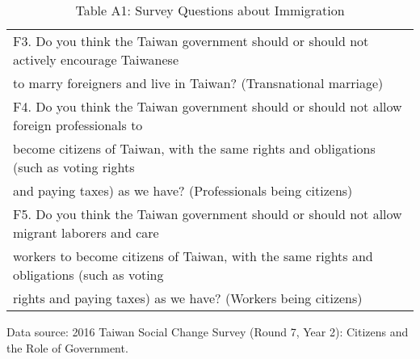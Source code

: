 \documentclass[12pt]{article}
\begin{document}
\begin{table}[ht!]
\begin{center}
  \begin{threeparttable}
\caption*{Table A1: Survey Questions about Immigration}
\begin{tabular}{l} 
\toprule
\midrule
F3. Do you think the Taiwan government should or should not actively encourage Taiwanese  \\
\qquad to marry foreigners and live in Taiwan? (Transnational marriage)   \\
F4. Do you think the Taiwan government should or should not allow foreign professionals to \\ 
\qquad become citizens of Taiwan, with the same rights and obligations (such as voting rights \\ 
\qquad and paying taxes) as we have? (Professionals being citizens)    \\
F5. Do you think the Taiwan government should or should not allow migrant laborers and care \\ 
\qquad workers to become citizens of Taiwan, with the same rights and obligations (such as voting \\ 
\qquad rights and paying taxes) as we have? (Workers being citizens)  \\
\toprule
\bottomrule
\end{tabular}
\begin{tablenotes}
  \item \footnotesize{Data source: 2016 Taiwan Social Change Survey (Round 7, Year 2): Citizens and the Role of Government.}
\end{tablenotes}
  \end{threeparttable}
\end{center}
\end{table} 


\clearpage


\newpage
\end{document}

